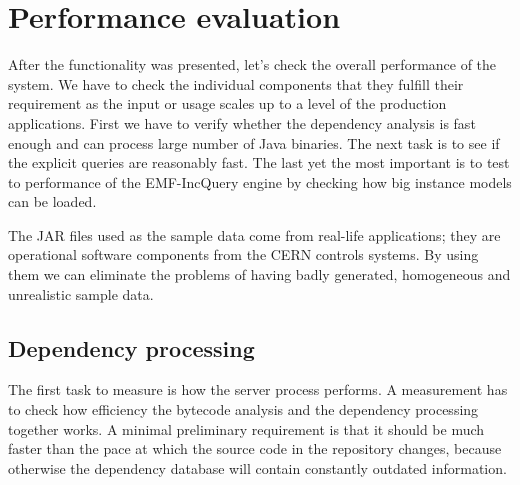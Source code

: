 \chapter{Performance evaluation}

After the functionality was presented, let's check the overall performance of
the system. We have to check the individual components that they fulfill their
requirement as the input or usage scales up to a level of the production
applications. First we have to verify whether the dependency analysis is fast
enough and can process large number of Java binaries. The next task is to see if
the explicit queries are reasonably fast. The last yet the most important is to
test to performance of the EMF-IncQuery engine by checking how big instance
models can be loaded.

The JAR files used as the sample data come from real-life applications; they are
operational software components from the CERN controls systems. By using them we
can eliminate the problems of having badly generated, homogeneous and
unrealistic sample data.

\section{Dependency processing}
\label{sect:depproc}
The first task to measure is how the server process performs.
A measurement has to check how efficiency the bytecode analysis and the
dependency processing together works. A minimal preliminary requirement is that
it should be much faster than the pace at which the source code in the
repository changes, because otherwise the dependency database will contain
constantly outdated information.


